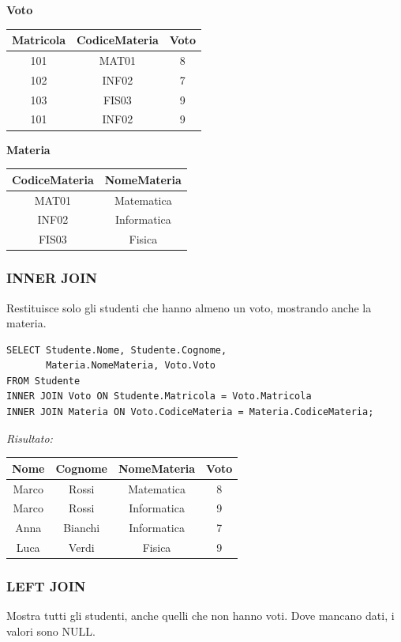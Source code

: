 \documentclass[a4paper,12pt]{article}
\begin{document}
\textbf{Voto}
\begin{center}
\begin{tabular}{|c|c|c|}
\hline
\textbf{Matricola} & \textbf{CodiceMateria} & \textbf{Voto} \\
\hline
101 & MAT01 & 8 \\
102 & INF02 & 7 \\
103 & FIS03 & 9 \\
101 & INF02 & 9 \\
\hline
\end{tabular}
\end{center}

\textbf{Materia}
\begin{center}
\begin{tabular}{|c|c|}
\hline
\textbf{CodiceMateria} & \textbf{NomeMateria} \\
\hline
MAT01 & Matematica \\
INF02 & Informatica \\
FIS03 & Fisica \\
\hline
\end{tabular}
\end{center}

\subsubsection{INNER JOIN}
Restituisce solo gli studenti che hanno almeno un voto, mostrando anche la materia.

\begin{verbatim}
SELECT Studente.Nome, Studente.Cognome,
       Materia.NomeMateria, Voto.Voto
FROM Studente
INNER JOIN Voto ON Studente.Matricola = Voto.Matricola
INNER JOIN Materia ON Voto.CodiceMateria = Materia.CodiceMateria;
\end{verbatim}

\textit{Risultato:}
\begin{center}
\begin{tabular}{|c|c|c|c|}
\hline
Nome & Cognome & NomeMateria & Voto \\
\hline
Marco & Rossi & Matematica & 8 \\
Marco & Rossi & Informatica & 9 \\
Anna & Bianchi & Informatica & 7 \\
Luca & Verdi & Fisica & 9 \\
\hline
\end{tabular}
\end{center}

\subsubsection{LEFT JOIN}
Mostra tutti gli studenti, anche quelli che non hanno voti. Dove mancano dati, i valori sono NULL.
\end{document}
